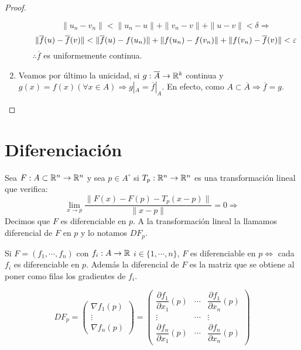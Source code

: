 \begin{theorem}
\begin{proof}
\begin{enumerate}
\begin{enumerate}
\begin{equation}
          \|u_n - v_n\| < \|u_n - u\| + \|v_n - v\| + \|u - v\| < \delta \Rightarrow
        \end{equation}
        \begin{equation}
          \|\overline{f}(u) - \overline{f}(v)\| < \|\overline{f}(u) - f(u_n)\| + \|f(u_n) - f(v_n)\| + \|f(v_n) - \overline{f}(v)\| < \varepsilon
        \end{equation} $\therefore \overline{f}$ es uniformemente continua.
      \end{enumerate}
      \item Veamos por último la unicidad, si $g: \overline{A} \to \mathbb{R}^k$ continua y $g(x) = f(x) (\forall x \in A) \Rightarrow g|_A = \overline{f}|_A$. En efecto, como $A \subset \overline{A} \Rightarrow \overline{f} = g$. 
    \end{enumerate}
  \end{proof}
\end{theorem}

\section{Diferenciación}

\begin{definition}
  Sea $F : A \subset \mathbb{R}^n \to \mathbb{R}^n$ y sea $p \in A^{\circ}$ si $T_p : \mathbb{R}^n \to \mathbb{R}^n$ es una transformación lineal que verifica:
  \begin{equation}
    \lim_{x \to p} \dfrac{\| F(x) - F(p) - T_p(x-p) \|}{\|x-p\|} = 0 \Rightarrow
  \end{equation} Decimos que $F$ es diferenciable en $p$. A la transformación lineal la llamamos diferencial de $F$ en $p$ y lo notamos $DF_p$.
\end{definition}

Si $F = (f_1, \cdots, f_n)$ con $f_i: A \to \mathbb{R}$ $i \in \{1, \cdots, n\}$, $F$ es diferenciable en $p \iff$ cada $f_i$ es diferenciable en $p$.
Además la diferencial de $F$ es la matriz que se obtiene al poner como filas los gradientes de $f_i$.

\begin{equation}
  DF_p = \begin{pmatrix}
    \nabla f_1(p) \\
    \vdots \\
    \nabla f_n(p)
  \end{pmatrix} = \begin{pmatrix}
    \dfrac{\partial f_1}{\partial x_1}(p) & \cdots & \dfrac{\partial f_1}{\partial x_n}(p) \\
    \vdots & \cdots & \vdots \\
    \dfrac{\partial f_n}{\partial x_1}(p) & \cdots & \dfrac{\partial f_n}{\partial x_n}(p)
  \end{pmatrix}
\end{equation}

